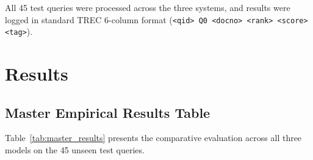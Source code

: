 \documentclass[11pt,a4paper]{article}
\begin{document}
All 45 test queries were processed across the three systems, and results were logged in standard TREC 6-column format (\texttt{<qid> Q0 <docno> <rank> <score> <tag>}).

\section{Results}

\subsection{Master Empirical Results Table}
Table~\ref{tab:master_results} presents the comparative evaluation across all three models on the 45 unseen test queries.
\end{document}
